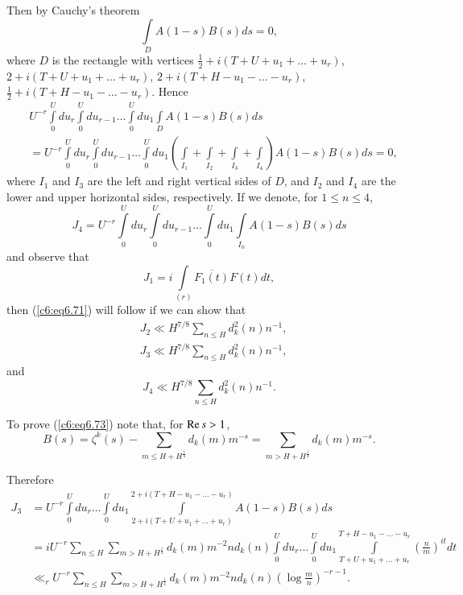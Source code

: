 Then by Cauchy's theorem
$$
\int\limits_D A(1-s) B(s) ds = 0,
$$
where $D$ is the rectangle with vertices $\frac{1}{2} + i (T + U + u_1
+ \ldots + u_r)$, $2 + i (T + U + u_1 + \ldots + u_r)$, $2+ i(T+ H-u_1
- \ldots - u_r)$, $\frac{1}{2} + i (T + H - u_1 - \ldots -
u_r)$. Hence 
{\fontsize{10}{12}\selectfont
\begin{align*}
& U^{-r} \int\limits^U_0 du_r \int\limits^U_0 du_{r-1} \ldots
  \int\limits^U_0 du_1 \int\limits_D A(1-s) B (s) ds\\ 
& = U^{-r} \int\limits^U_0 du_r \int\limits^U_0 du_{r-1} \ldots
  \int\limits^U_0 du_1 \left(\int\limits_{I_1} + \int\limits_{I_2}  +
  \int\limits_{I_3} + \int\limits_{I_4} \right) A(1-s) B(s) ds = 0,  
\end{align*}}
where $I_1$ and $I_3$ are the left and right vertical sides of $D$,
and $I_2$ and $I_4$ are the lower and upper horizontal sides,
respectively. If we denote, for $1 \leq n \leq 4$, 
$$
J_4 = U^{-r} \int\limits^U_0 du_r \int\limits^U_0 du_{r-1} \ldots
\int\limits^U_0 du_1 \int\limits_{I_n} A (1-s) B(s) ds  
$$
and observe that 
$$
J_1 = i \int\limits_{(r)} \overline{F_1(t)}  F(t) dt,
$$
then (\ref{c6:eq6.71}) will follow if we can show that 
\begin{align}
& J_2 \ll H^{7/8} \sum\limits_{n \leq H} d^2_k (n) n^{-1},
  \label{c6:eq6.72}\\[4pt] 
& J_3 \ll H^{7/8} \sum\limits_{n\leq H} d^2_k (n) n^{-1},
  \label{c6:eq6.73} 
\end{align}\pageoriginale
and 
\begin{equation}
J_4 \ll H^{7/8} \sum\limits_{n \leq H} d^2_k (n)
n^{-1}. \label{c6:eq6.74} 
\end{equation}

To prove (\ref{c6:eq6.73}) note that, for $\operatorname{Re} s > 1$,
$$
B(s) = \zeta^k (s) - \sum\limits_{m\leq H + H^{\frac{1}{4}}}
d_k(m)m^{-s} = \sum\limits_{m > H + H^{\frac{1}{4}}} d_k(m) m^{-s}. 
$$

Therefore
{\fontsize{10}{12}\selectfont
\begin{align*}
J_3 &= U^{-r} \int\limits^U_0 du_r \ldots \int\limits^U_0 du_1
\int\limits^{2+i(T+H -u_1 - \ldots - u_r)}_{2+i(T+U+u_1 + \ldots +
  u_r)} A(1-s) B(s) ds\\ 
& = i U^{-r} \sum\limits_{n \leq H} \sum\limits_{m > H +
  H^{\frac{1}{4}}} d_k(m)m^{-2} nd_k (n) \int\limits^U_0 du_r \ldots
\int\limits^U_0 du_1 \int\limits^{T+H-u_1 -\ldots -
  u_r}_{T+U+u_1+\ldots + u_r} \left(\frac{n}{m} \right)^{it} dt\\ 
& \ll_r U^{-r} \sum\limits_{n\leq H} \sum\limits_{m> H+
  H^{\frac{1}{4}}} d_k(m) m^{-2} nd_k (n) \left(\log\frac{m}{n}
\right)^{-r-1}. 
\end{align*}}

